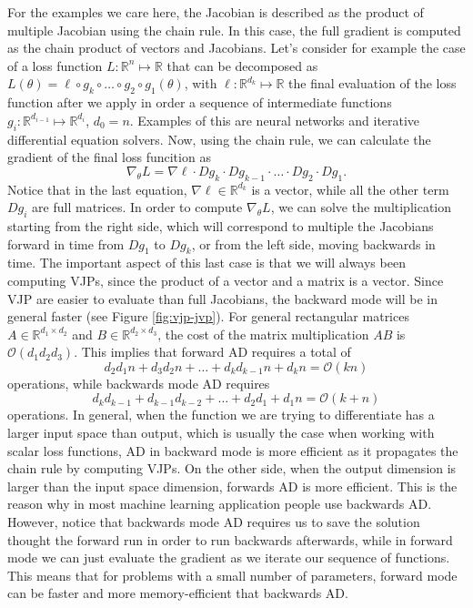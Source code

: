 For the examples we care here, the Jacobian is described as the product of multiple Jacobian using the chain rule. In this case, the full gradient is computed as the chain product of vectors and Jacobians. Let's consider for example the case of a loss function $L : \mathbb R^n \mapsto \mathbb R$ that can be decomposed as $L(\theta) = \ell \circ g_{k} \circ \ldots \circ g_2 \circ g_1(\theta)$, with $\ell : \mathbb R^{d_k} \mapsto \mathbb R$ the final evaluation of the loss function after we apply in order a sequence of intermediate functions $g_i : \mathbb R^{d_{i-1}} \mapsto \mathbb R^{d_i}$, $d_0 = n$. Examples of this are neural networks and iterative differential equation solvers. Now, using the chain rule, we can calculate the gradient of the final loss funcition as
\begin{equation}
 \nabla_\theta L = \nabla \ell \cdot Dg_{k} \cdot Dg_{k-1} \cdot \ldots \cdot Dg_2 \cdot Dg_1.
\end{equation}
Notice that in the last equation, $\nabla \ell \in \mathbb R^{d_k}$ is a vector, while all the other term $Dg_i$ are full matrices. In order to compute $\nabla_\theta L$, we can solve the multiplication starting from the right side, which will correspond to multiple the Jacobians forward in time from $Dg_1$ to $Dg_k$, or from the left side, moving backwards in time. The important aspect of this last case is that we will always been computing VJPs, since the product of a vector and a matrix is a vector. Since VJP are easier to evaluate than full Jacobians, the backward mode will be in general faster (see Figure \ref{fig:vjp-jvp}). For general rectangular matrices $A\in \mathbb R^{d_1 \times d_2}$ and $B \in \mathbb R^{d_2 \times d_3}$, the cost of the matrix multiplication $AB$ is $\mathcal O (d_1 d_2 d_3)$. This implies that forward AD requires a total of
\begin{equation}
 d_2 d_1 n + d_3 d_2 n + \ldots + d_k d_{k-1} n + d_k n = \mathcal O (kn)
\end{equation}
operations, while backwards mode AD requires
\begin{equation}
 d_k d_{k-1} + d_{k-1} d_{k-2} + \ldots + d_2 d_1 + d_1 n = \mathcal O (k + n)
\end{equation}
operations.
In general, when the function we are trying to differentiate has a larger input space than output, which is usually the case when working with scalar loss functions, AD in backward mode is more efficient as it propagates the chain rule by computing VJPs. On the other side, when the output dimension is larger than the input space dimension, forwards AD is more efficient. This is the reason why in most machine learning application people use backwards AD. However, notice that backwards mode AD requires us to save the solution thought the forward run in order to run backwards afterwards, while in forward mode we can just evaluate the gradient as we iterate our sequence of functions. This means that for problems with a small number of parameters, forward mode can be faster and more memory-efficient that backwards AD.

